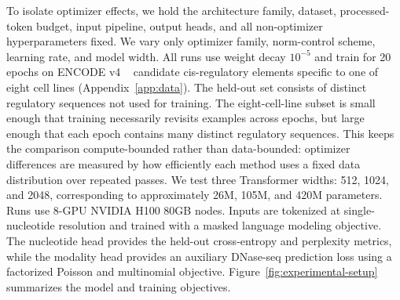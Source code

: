 \documentclass{article}
\begin{document}
To isolate optimizer effects, we hold the architecture family, dataset, processed-token budget, input pipeline, output heads, and all non-optimizer hyperparameters fixed. We vary only optimizer family, norm-control scheme, learning rate, and model width. All runs use weight decay $10^{-5}$ and train for 20 epochs on ENCODE v4 ~\citep{encode-v4} candidate cis-regulatory elements specific to one of eight cell lines (Appendix~\ref{app:data}). The held-out set consists of distinct regulatory sequences not used for training. The eight-cell-line subset is small enough that training necessarily revisits examples across epochs, but large enough that each epoch contains many distinct regulatory sequences. This keeps the comparison compute-bounded rather than data-bounded: optimizer differences are measured by how efficiently each method uses a fixed data distribution over repeated passes. We test three Transformer widths: 512, 1024, and 2048, corresponding to approximately 26M, 105M, and 420M parameters. Runs use 8-GPU NVIDIA H100 80GB nodes. Inputs are tokenized at single-nucleotide resolution and trained with a masked language modeling objective. The nucleotide head provides the held-out cross-entropy and perplexity metrics, while the modality head provides an auxiliary DNase-seq prediction loss using a factorized Poisson and multinomial objective. Figure~\ref{fig:experimental-setup} summarizes the model and training objectives.
\end{document}
